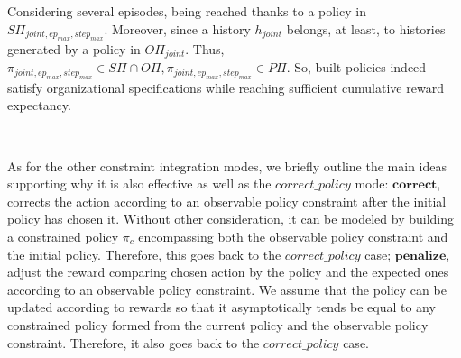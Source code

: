 \begin{proofoutline}
    Considering several episodes, being reached thanks to a policy in $\allowbreak S\Pi_{joint,ep_{max},step_{max}}$. Moreover, since a history $h_{joint}$ belongs, at least, to histories generated by a policy in $O\Pi_{joint}$. Thus, $\pi_{joint,ep_{max},step_{max}} \in S\Pi \cap O\Pi, \pi_{joint,ep_{max},step_{max}} \in P\Pi$. So, built policies indeed satisfy organizational specifications while reaching sufficient cumulative reward expectancy.

    \

    As for the other constraint integration modes, we briefly outline the main ideas supporting why it is also effective as well as the $correct\_policy$ mode:
    $\mathbf{correct}$, corrects the action according to an observable policy constraint after the initial policy has chosen it. Without other consideration, it can be modeled by building a constrained policy $\pi_c$ encompassing both the observable policy constraint and the initial policy. Therefore, this goes back to the $correct\_policy$ case;
    $\mathbf{penalize}$, adjust the reward comparing chosen action by the policy and the expected ones according to an observable policy constraint. We assume that the policy can be updated according to rewards so that it asymptotically tends be equal to any constrained policy formed from the current policy and the observable policy constraint. Therefore, it also goes back to the $correct\_policy$ case.

\end{proofoutline}